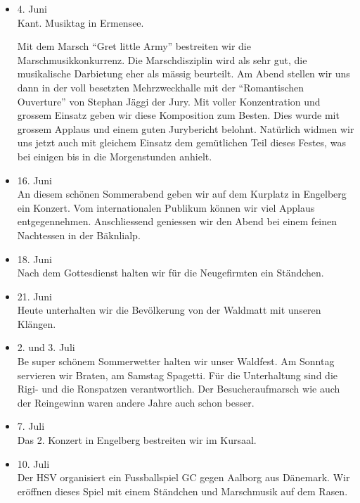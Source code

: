 \begin{history}
\begin{itemize}
        \item[]4. Juni\\
        Kant. Musiktag in Ermensee.

        Mit dem Marsch \enquote{Gret little Army}
        bestreiten wir die Marschmusikkonkurrenz. Die Marschdisziplin wird als
        sehr gut, die musikalische Darbietung eher als mässig beurteilt. Am
        Abend stellen wir uns dann in der voll besetzten Mehrzweckhalle mit der
        \enquote{Romantischen Ouverture} von Stephan Jäggi der Jury. Mit voller
        Konzentration und grossem Einsatz geben wir diese Komposition zum
        Besten. Dies wurde mit grossem Applaus und einem guten Jurybericht
        belohnt. Natürlich widmen wir uns jetzt auch mit gleichem Einsatz dem
        gemütlichen Teil dieses Festes, was bei einigen bis in die Morgenstunden
        anhielt.

        \item[]16. Juni\\
        An diesem schönen Sommerabend geben wir auf dem Kurplatz in Engelberg
        ein Konzert. Vom internationalen Publikum können wir viel Applaus
        entgegennehmen. Anschliessend geniessen wir den Abend bei einem feinen
        Nachtessen in der Bäknlialp.

        \item[]18. Juni\\
        Nach dem Gottesdienst halten wir für die Neugefirmten ein Ständchen.

        \item[]21. Juni\\
        Heute unterhalten wir die Bevölkerung von der Waldmatt mit unseren
        Klängen.

        \item[]2. und 3. Juli\\
        Be super schönem Sommerwetter halten wir unser Waldfest. Am Sonntag
        servieren wir Braten, am Samstag Spagetti. Für die Unterhaltung sind die
        Rigi- und die Ronspatzen verantwortlich. Der Besucheraufmarsch wie auch
        der Reingewinn waren andere Jahre auch schon besser.

        \item[]7. Juli\\
        Das 2. Konzert in Engelberg bestreiten wir im Kursaal.

        \item[]10. Juli\\
        Der HSV organisiert ein Fussballspiel GC gegen Aalborg aus Dänemark. Wir
        eröffnen dieses Spiel mit einem Ständchen und Marschmusik auf dem Rasen.


\end{itemize}
\end{history}
